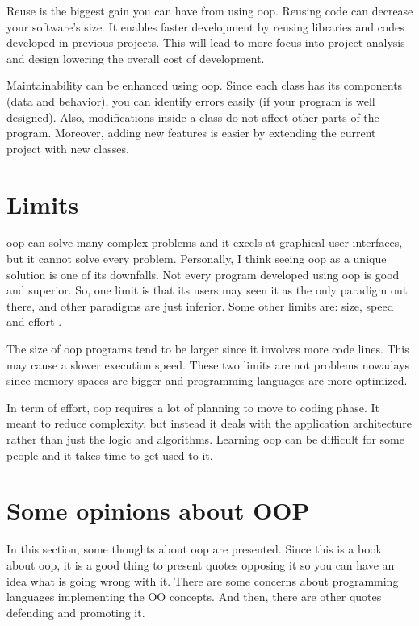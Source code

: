 \documentclass[12pt]{book}
\begin{document}
Reuse is the biggest gain you can have from using \ac{oop}. 
Reusing code can decrease your software's size. 
It enables faster development by reusing libraries and codes developed in previous projects. 
This will lead to more focus into project analysis and design lowering the overall cost of development. 

Maintainability can be enhanced using \ac{oop}. 
Since each class has its components (data and behavior), you can identify errors easily (if your program is well designed).
Also, modifications inside a class do not affect other parts of the program. 
Moreover, adding new features is easier by extending the current project with new classes.

\section{Limits}

\ac{oop} can solve many complex problems and it excels at graphical user interfaces, but it cannot solve every problem. 
Personally, I think seeing \ac{oop} as a unique solution is one of its downfalls. 
Not every program developed using \ac{oop} is good and superior. 
So, one limit is that its users may seen it as the only paradigm out there, and other paradigms are just inferior.
Some other limits are: size, speed and effort \citep{2015-popyack-boady}.

The size of \ac{oop} programs tend to be larger since it involves more code lines. 
This may cause a slower execution speed. 
These two limits are not problems nowadays since memory spaces are bigger and programming languages are more optimized.

In term of effort, \ac{oop} requires a lot of planning to move to coding phase.
It meant to reduce complexity, but instead it deals with the application architecture rather than just the logic and algorithms.
Learning \ac{oop} can be difficult for some people and it takes time to get used to it.

\section{Some opinions about OOP}

In this section, some thoughts about \ac{oop} are presented. 
Since this is a book about \ac{oop}, it is a good thing to present quotes opposing it \citep{2016-yegor} so you can have an idea what is going wrong with it. 
There are some concerns about programming languages implementing the OO concepts. 
And then, there are other quotes defending and promoting it.
\end{document}

